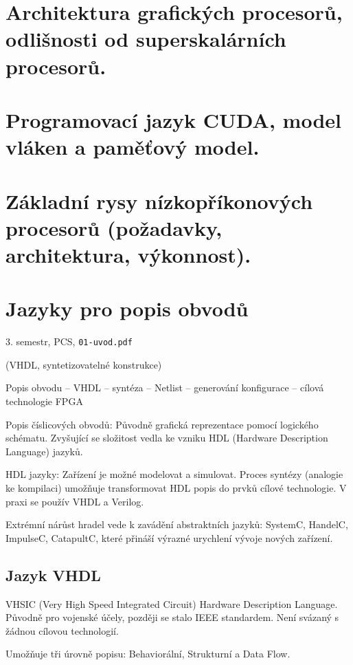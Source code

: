 \documentclass[a4paper, 11pt]{report}
\begin{document}
\chapter{Architektura grafických procesorů, odlišnosti od superskalárních procesorů.} \label{cha:49}
\chapter{Programovací jazyk CUDA, model vláken a paměťový model.} \label{cha:50}
\chapter{Základní rysy nízkopříkonových procesorů (požadavky, architektura, výkonnost).} \label{cha:51}
\chapter{Jazyky pro popis obvodů} \label{cha:52}
3. semestr, PCS, \texttt{01-uvod.pdf}

(VHDL, syntetizovatelné konstrukce)

Popis obvodu -- VHDL -- syntéza -- Netlist -- generování konfigurace -- cílová technologie FPGA

Popis číslicových obvodů: Původně grafická reprezentace pomocí logického schématu. Zvyšující se složitost vedla ke vzniku HDL (Hardware Description Language) jazyků.

HDL jazyky: Zařízení je možné modelovat a simulovat. Proces syntézy (analogie ke kompilaci) umožňuje transformovat HDL popis do prvků cílové technologie. V praxi se použív VHDL a Verilog.

Extrémní nárůst hradel vede k zavádění abstraktních jazyků: SystemC, HandelC, ImpulseC, CatapultC, které přináší výrazné urychlení vývoje nových zařízení.

\section{Jazyk VHDL}
VHSIC (Very High Speed Integrated Circuit) Hardware Description Language. Původně pro vojenské účely, později se stalo IEEE standardem. Není svázaný s žádnou cílovou technologií.

Umožňuje tři úrovně popisu: Behaviorální, Strukturní a Data Flow.
\end{document}
